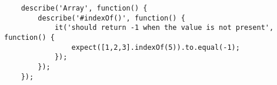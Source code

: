 
\begin{lstlisting}
	describe('Array', function() {
		describe('#indexOf()', function() {
			it('should return -1 when the value is not present', function() {
				expect([1,2,3].indexOf(5)).to.equal(-1);
			});
		});
	});
\end{lstlisting}
